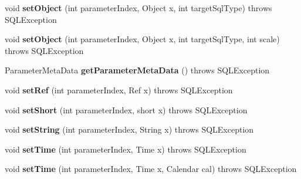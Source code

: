 \begin{DoxyCompactItemize}
void {\bfseries set\+Object} (int parameter\+Index, Object x, int target\+Sql\+Type)  throws S\+Q\+L\+Exception 
\item 
\mbox{\label{classcom_1_1mysql_1_1cj_1_1jdbc_1_1_prepared_statement_wrapper_a73032c272bd4067076ef522ae21db13e}} 
void {\bfseries set\+Object} (int parameter\+Index, Object x, int target\+Sql\+Type, int scale)  throws S\+Q\+L\+Exception 
\item 
\mbox{\label{classcom_1_1mysql_1_1cj_1_1jdbc_1_1_prepared_statement_wrapper_a29b6b777e1129b87c63a81560f39f7a7}} 
Parameter\+Meta\+Data {\bfseries get\+Parameter\+Meta\+Data} ()  throws S\+Q\+L\+Exception 
\item 
\mbox{\label{classcom_1_1mysql_1_1cj_1_1jdbc_1_1_prepared_statement_wrapper_aecf41df11df7d316b8f1d4fc00b67bb2}} 
void {\bfseries set\+Ref} (int parameter\+Index, Ref x)  throws S\+Q\+L\+Exception 
\item 
\mbox{\label{classcom_1_1mysql_1_1cj_1_1jdbc_1_1_prepared_statement_wrapper_af032e75fac29b62869607b360040483d}} 
void {\bfseries set\+Short} (int parameter\+Index, short x)  throws S\+Q\+L\+Exception 
\item 
\mbox{\label{classcom_1_1mysql_1_1cj_1_1jdbc_1_1_prepared_statement_wrapper_ae97747fc89b30ecaed9d390f6204cc97}} 
void {\bfseries set\+String} (int parameter\+Index, String x)  throws S\+Q\+L\+Exception 
\item 
\mbox{\label{classcom_1_1mysql_1_1cj_1_1jdbc_1_1_prepared_statement_wrapper_a76e610d26d131045878903c575bb363b}} 
void {\bfseries set\+Time} (int parameter\+Index, Time x)  throws S\+Q\+L\+Exception 
\item 
\mbox{\label{classcom_1_1mysql_1_1cj_1_1jdbc_1_1_prepared_statement_wrapper_ad827fffb5931fde21e8c3d10cc8866f4}} 
void {\bfseries set\+Time} (int parameter\+Index, Time x, Calendar cal)  throws S\+Q\+L\+Exception 

\end{DoxyCompactItemize}
